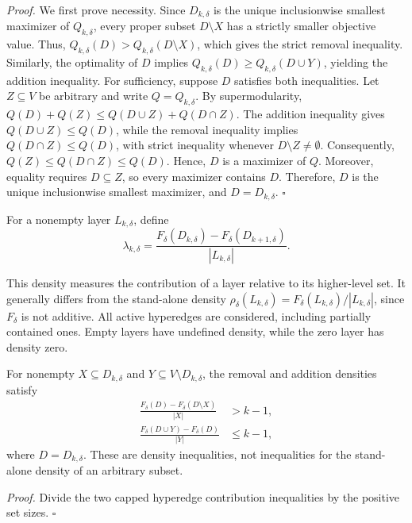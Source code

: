 \documentclass[twocolumn]{svjour3}
\begin{document}
\emph{Proof.}
We first prove necessity. Since $D_{k,\delta}$ is the
unique inclusionwise smallest maximizer of $Q_{k,\delta}$,
every proper subset $D\setminus X$ has a strictly smaller
objective value. Thus,
$Q_{k,\delta}(D)>Q_{k,\delta}(D\setminus X)$,
which gives the strict removal inequality.
Similarly, the optimality of $D$ implies
$Q_{k,\delta}(D)\ge Q_{k,\delta}(D\cup Y)$,
yielding the addition inequality.
For sufficiency, suppose $D$ satisfies both inequalities.
Let $Z\subseteq V$ be arbitrary and write $Q=Q_{k,\delta}$.
By supermodularity,
$Q(D)+Q(Z)
\le Q(D\cup Z)+Q(D\cap Z)$.
The addition inequality gives $Q(D\cup Z)\le Q(D)$,
while the removal inequality implies
$Q(D\cap Z)\le Q(D)$, with strict inequality whenever
$D\setminus Z\ne\emptyset$. Consequently,
$Q(Z)\le Q(D\cap Z)\le Q(D)$.
Hence, $D$ is a maximizer of $Q$. Moreover, equality
requires $D\subseteq Z$, so every maximizer contains
$D$. Therefore, $D$ is the unique inclusionwise
smallest maximizer, and $D=D_{k,\delta}$.
\hfill$\square$





\begin{definition}\label{layerdensity}
For a nonempty layer $L_{k,\delta}$, define
\begin{equation*}
 \lambda_{k,\delta}=\frac{F_\delta(D_{k,\delta})-F_\delta(D_{k+1,\delta})}{|L_{k,\delta}|}.
\end{equation*}
\end{definition}

This density measures the contribution of a layer relative to its higher-level set. It generally differs from the stand-alone density $\rho_\delta(L_{k,\delta})=F_\delta(L_{k,\delta})/|L_{k,\delta}|$, since $F_\delta$ is not additive. All active hyperedges are considered, including partially contained ones. Empty layers have undefined density, while the zero layer has density zero.

\begin{lemma}\label{pd1}
For nonempty $X\subseteq D_{k,\delta}$ and $Y\subseteq V\setminus D_{k,\delta}$, the removal and addition densities satisfy
\begin{align*}
 \frac{F_\delta(D)-F_\delta(D\setminus X)}{|X|}&>k-1,\\
 \frac{F_\delta(D\cup Y)-F_\delta(D)}{|Y|}&\le k-1,
\end{align*}
where $D=D_{k,\delta}$. These are density inequalities, not inequalities for the stand-alone density of an arbitrary subset.
\end{lemma}
\emph{Proof.} Divide the two capped hyperedge contribution inequalities by the positive set sizes. \hfill$\square$
\end{document}
